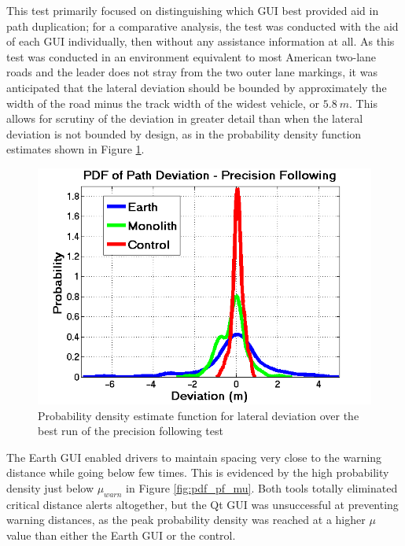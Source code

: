 \documentclass[twocolumn,10pt]{article}
\begin{document}
    This test primarily focused on distinguishing which GUI best provided aid in path duplication; for a comparative analysis, the test was conducted with the aid of each GUI individually, then without any assistance information at all.  As this test was conducted in an environment equivalent to most American two-lane roads and the leader does not stray from the two outer lane markings, it was anticipated that the lateral deviation should be bounded by approximately the width of the road minus the track width of the widest vehicle, or $5.8~m$.  This allows for scrutiny of the deviation in greater detail than when the lateral deviation is not bounded by design, as in the probability density function estimates shown in Figure \ref{fig:pdf_pf_dev}.

    \begin{figure}[ht] \centering
      \includegraphics[width=\columnwidth]{../graphics/precision_following_dev_pdf.png}
      \caption{Probability density estimate function for lateral deviation over the best run of the precision following test}
      \label{fig:pdf_pf_dev}
    \end{figure}

    The Earth GUI enabled drivers to maintain spacing very close to the warning distance while going below few times. This is evidenced by the high probability density just below $\mu_{warn}$ in Figure \ref{fig:pdf_pf_mu}. Both tools totally eliminated critical distance alerts altogether, but the Qt GUI was unsuccessful at preventing warning distances, as the peak probability density was reached at a higher $\mu$ value than either the Earth GUI or the control.
    
\end{document}
